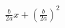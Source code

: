 \documentclass[preview]{standalone}
\begin{document}
\begin{align*}
\frac{b}{2 a} x + {\left( \frac{b}{2 a} \right)}^{2}
\end{align*}
\end{document}

